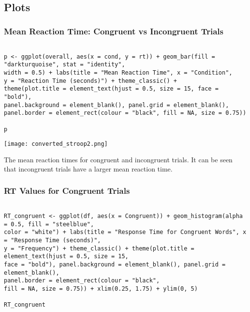 \documentclass{article}
\begin{document}
\subsection{Plots}
\label{sec:orgbd910e2}
\subsubsection{Mean Reaction Time: Congruent vs Incongruent Trials}
\label{sec:org67bf5a6}
\begin{verbatim}

p <- ggplot(overall, aes(x = cond, y = rt)) + geom_bar(fill = "darkturquoise", stat = "identity", 
width = 0.5) + labs(title = "Mean Reaction Time", x = "Condition", 
y = "Reaction Time (seconds)") + theme_classic() + 
theme(plot.title = element_text(hjust = 0.5, size = 15, face = "bold"), 
panel.background = element_blank(), panel.grid = element_blank(), 
panel.border = element_rect(colour = "black", fill = NA, size = 0.75))

p
\end{verbatim}

\begin{center}
\texttt{[image: converted\_stroop2.png]}
\end{center}

\begin{center}
The mean reaction times for congruent and incongruent trials. It can be seen  \\ that incongruent trials have a larger mean reaction time.
\end{center}

\subsubsection{RT Values for Congruent Trials}
\label{sec:orgbf5e070}
\begin{verbatim}

RT_congruent <- ggplot(df, aes(x = Congruent)) + geom_histogram(alpha = 0.5, fill = "steelblue", 
color = "white") + labs(title = "Response Time for Congruent Words", x = "Response Time (seconds)", 
y = "Frequency") + theme_classic() + theme(plot.title = element_text(hjust = 0.5, size = 15, 
face = "bold"), panel.background = element_blank(), panel.grid = element_blank(), 
panel.border = element_rect(colour = "black", 
fill = NA, size = 0.75)) + xlim(0.25, 1.75) + ylim(0, 5)

RT_congruent

\end{verbatim}
\end{document}
